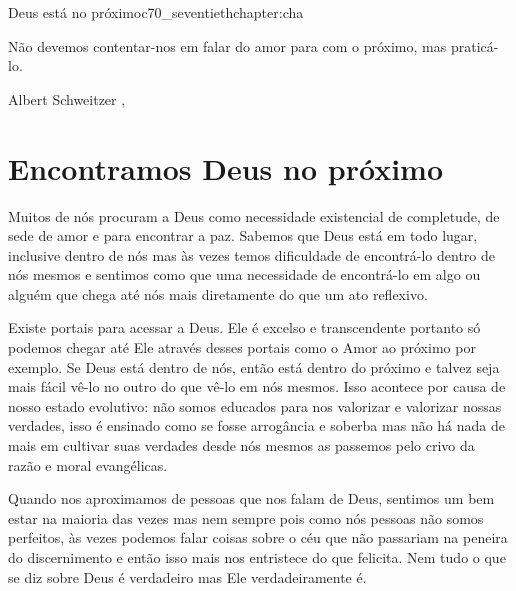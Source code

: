 \begin{chapterpage}{Deus está no próximo}{c70_seventiethchapter:cha}
 
\begin{myquotation}Não devemos contentar-nos em falar do amor para com o próximo, mas praticá-lo.
\par\vspace*{15mm}
\mbox{}\hfill \emdash{}Albert Schweitzer
, %
\par\end{myquotation}

\end{chapterpage}



\section{Encontramos Deus no próximo}\label{c1_basicformatting:sec}

\emdash{}Muitos de nós procuram a Deus como necessidade existencial de completude, de sede de amor e para encontrar a paz. Sabemos que Deus está em todo lugar, inclusive dentro de nós mas às vezes temos dificuldade de encontrá-lo dentro de nós mesmos e sentimos como que uma necessidade de encontrá-lo em algo ou alguém que chega até nós mais diretamente do que um ato reflexivo.

\emdash{}Existe portais para acessar a Deus. Ele é excelso e transcendente portanto só podemos chegar até Ele através desses portais como o Amor ao próximo por exemplo. Se Deus está dentro de nós, então está dentro do próximo e talvez seja mais fácil vê-lo no outro do que vê-lo em nós mesmos. Isso acontece por causa de nosso estado evolutivo: não somos educados para nos valorizar e valorizar nossas verdades, isso é ensinado como se fosse arrogância e soberba mas não há nada de mais em cultivar suas verdades desde nós mesmos as passemos pelo crivo da razão e moral evangélicas.

\emdash{}Quando nos aproximamos de pessoas que nos falam de Deus, sentimos um bem estar na maioria das vezes mas nem sempre pois como nós pessoas não somos perfeitos, às vezes podemos falar coisas sobre o céu que não passariam na peneira do discernimento e então isso mais nos entristece do que felicita. Nem tudo o que se diz sobre Deus é verdadeiro mas Ele verdadeiramente é.


